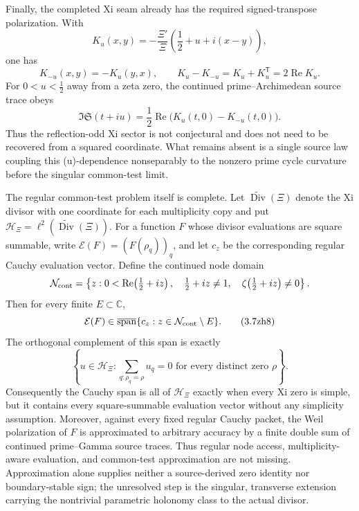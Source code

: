 \documentclass[11pt]{article}
\theoremstyle{definition}
\theoremstyle{remark}
\newcommand{\C}{\mathbb C}
\newcommand{\Rea}{\operatorname{Re}}
\newcommand{\Div}{\operatorname{Div}}
\begin{document}
Finally, the completed Xi seam already has the required signed-transpose
polarization.  With
\[
 K_u(x,y)=-\frac{\Xi'}{\Xi}
   \left(\frac12+u+i(x-y)\right),
\]
one has
\[
 K_{-u}(x,y)=-K_u(y,x),\qquad
 K_u-K_{-u}=K_u+K_u^{\mathsf T}=2\Rea K_u.
\tag{3.7zh6}\label{eq:xi-aperture-signed-transpose}
\]
For \(0<u<\tfrac12\) away from a zeta zero, the continued prime--Archimedean
source trace obeys
\[
 \Im\mathfrak S(t+iu)
     =\frac12\Rea\bigl(K_u(t,0)-K_{-u}(t,0)\bigr).
\tag{3.7zh7}\label{eq:source-to-odd-aperture}
\]
Thus the reflection-odd Xi sector is not conjectural and does not need to be
recovered from a squared coordinate.  What remains absent is a single
source law coupling this (u)-dependence nonseparably to the nonzero prime
cycle curvature before the singular common-test limit.

The regular common-test problem itself is complete.  Let
\(\widetilde{\Div}(\Xi)\) denote the Xi divisor with one coordinate for each
multiplicity copy and put
\(\mathcal H_\Xi=\ell^2(\widetilde{\Div}(\Xi))\).  For a function \(F\) whose
divisor evaluations are square summable, write
\(\mathcal E(F)=(F(\rho_q))_q\), and let \(c_z\) be the corresponding regular
Cauchy evaluation vector.  Define the continued node domain
\[
 \mathcal N_{\rm cont}=\left\{z:
 0<\Rea\!\left(\tfrac12+iz\right),\quad
 \tfrac12+iz\ne1,\quad
 \zeta\!\left(\tfrac12+iz\right)\ne0\right\}.
\]
Then for every finite \(E\subset\C\),
\[
 \mathcal E(F)\in
 \overline{\operatorname{span}}
 \{c_z:z\in\mathcal N_{\rm cont}\setminus E\}.
\tag{3.7zh8}\label{eq:continued-cauchy-density}
\]
The orthogonal complement of this span is exactly
\[
 \left\{u\in\mathcal H_\Xi:
   \sum_{q:\rho_q=\rho}u_q=0
   \text{ for every distinct zero }\rho\right\}.
\tag{3.7zh9}\label{eq:cauchy-multiplicity-annihilator}
\]
Consequently the Cauchy span is all of \(\mathcal H_\Xi\) exactly when every
Xi zero is simple, but it contains every square-summable evaluation vector
without any simplicity assumption.  Moreover, against every fixed regular
Cauchy packet, the Weil polarization of \(F\) is approximated to arbitrary
accuracy by a finite double sum of continued prime--Gamma source traces.
Thus regular node access, multiplicity-aware evaluation, and common-test
approximation are not missing.  Approximation alone supplies neither a
source-derived zero identity nor boundary-stable sign; the unresolved step
is the singular, transverse extension carrying the nontrivial parametric
holonomy class to the actual divisor.
\end{document}
